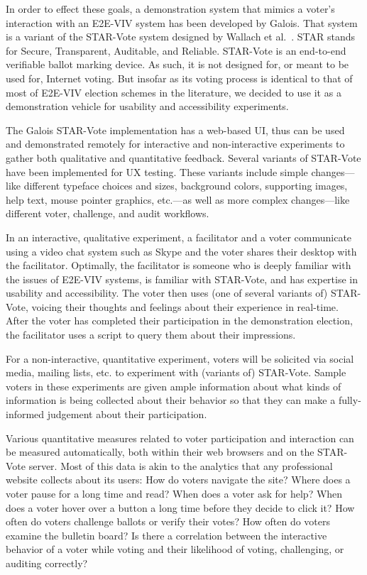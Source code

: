 In order to effect these goals, a demonstration system that mimics a
voter's interaction with an E2E-VIV system has been developed by
Galois. That system is a variant of the STAR-Vote system designed by
Wallach et al.~\cite{star-vote}. STAR stands for Secure, Transparent,
Auditable, and Reliable. STAR-Vote is an end-to-end verifiable ballot
marking device. As such, it is not designed for, or meant to be used
for, Internet voting. But insofar as its voting process is identical
to that of most of E2E-VIV election schemes in the literature, we
decided to use it as a demonstration vehicle for usability and
accessibility experiments.

The Galois STAR-Vote implementation has a web-based UI, thus can be
used and demonstrated remotely for interactive and non-interactive
experiments to gather both qualitative and quantitative feedback.
Several variants of STAR-Vote have been implemented for UX testing.
These variants include simple changes---like different typeface
choices and sizes, background colors, supporting images, help text,
mouse pointer graphics, etc.---as well as more complex changes---like
different voter, challenge, and audit workflows.

In an interactive, qualitative experiment, a facilitator and a voter
communicate using a video chat system such as Skype and the voter
shares their desktop with the facilitator. Optimally, the facilitator
is someone who is deeply familiar with the issues of E2E-VIV systems,
is familiar with STAR-Vote, and has expertise in usability and
accessibility. The voter then uses (one of several variants of)
STAR-Vote, voicing their thoughts and feelings about their experience
in real-time. After the voter has completed their participation in the
demonstration election, the facilitator uses a script to query them
about their impressions.

For a non-interactive, quantitative experiment, voters will be
solicited via social media, mailing lists, etc. to experiment with
(variants of) STAR-Vote. Sample voters in these experiments are given
ample information about what kinds of information is being collected
about their behavior so that they can make a fully-informed judgement
about their participation.

Various quantitative measures related to voter participation and
interaction can be measured automatically, both within their web
browsers and on the STAR-Vote server. Most of this data is akin to the
analytics that any professional website collects about its users: How
do voters navigate the site?  Where does a voter pause for a long time
and read?  When does a voter ask for help?  When does a voter hover
over a button a long time before they decide to click it?  How often
do voters challenge ballots or verify their votes?  How often do
voters examine the bulletin board?  Is there a correlation between the
interactive behavior of a voter while voting and their likelihood of
voting, challenging, or auditing correctly?

